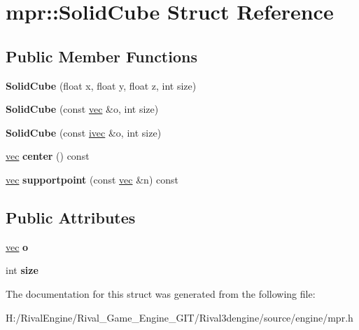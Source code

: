 \hypertarget{structmpr_1_1_solid_cube}{}\section{mpr\+:\+:Solid\+Cube Struct Reference}
\label{structmpr_1_1_solid_cube}
\subsection*{Public Member Functions}
\begin{DoxyCompactItemize}
\item 
\mbox{\label{structmpr_1_1_solid_cube_aab89c727a4d7896ad2649675f5479e6e}} 
{\bfseries Solid\+Cube} (float x, float y, float z, int size)
\item 
\mbox{\label{structmpr_1_1_solid_cube_a68229e91fbc350249292ed3c428cc491}} 
{\bfseries Solid\+Cube} (const \hyperlink{structvec}{vec} \&o, int size)
\item 
\mbox{\label{structmpr_1_1_solid_cube_a4860be1bf4ed793282e8c3e4bcd9a41b}} 
{\bfseries Solid\+Cube} (const \hyperlink{structivec}{ivec} \&o, int size)
\item 
\mbox{\label{structmpr_1_1_solid_cube_a50b4b100cdf960d37f652e6ffb82ba1e}} 
\hyperlink{structvec}{vec} {\bfseries center} () const
\item 
\mbox{\label{structmpr_1_1_solid_cube_a46c2945c58008a519e20496dd6ae108b}} 
\hyperlink{structvec}{vec} {\bfseries supportpoint} (const \hyperlink{structvec}{vec} \&n) const
\end{DoxyCompactItemize}
\subsection*{Public Attributes}
\begin{DoxyCompactItemize}
\item 
\mbox{\label{structmpr_1_1_solid_cube_a9bc48d8d05285ed128292c327da13118}} 
\hyperlink{structvec}{vec} {\bfseries o}
\item 
\mbox{\label{structmpr_1_1_solid_cube_aa3d9900c65db03ca441cb2d59fd7fd09}} 
int {\bfseries size}
\end{DoxyCompactItemize}


The documentation for this struct was generated from the following file\+:\begin{DoxyCompactItemize}
\item 
H\+:/\+Rival\+Engine/\+Rival\+\_\+\+Game\+\_\+\+Engine\+\_\+\+G\+I\+T/\+Rival3dengine/source/engine/mpr.\+h\end{DoxyCompactItemize}
